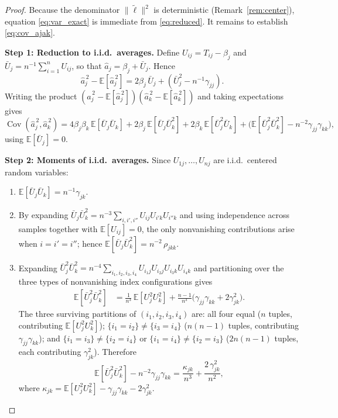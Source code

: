 \documentclass[11pt]{article}
\newcommand{\Cov}{\operatorname{Cov}}
\newcommand{\E}{\mathbb{E}}
\theoremstyle{plain}
\theoremstyle{definition}
\theoremstyle{remark}
\begin{document}
\begin{proof}
Because the denominator $\|\widetilde{\boldsymbol{\ell}}\|^2$ is
deterministic (Remark~\ref{rem:center}), equation \eqref{eq:var_exact}
is immediate from \eqref{eq:reduced}.
It remains to establish \eqref{eq:cov_ajak}.

\smallskip
\noindent\textbf{Step 1: Reduction to i.i.d.\ averages.}
Define $U_{ij} = T_{ij} - \beta_j$ and
$\bar U_j = n^{-1}\sum_{i=1}^n U_{ij}$, so that
$\widehat{a}_j = \beta_j + \bar U_j$.  Hence
\[
    \widehat{a}_j^{\,2} - \E[\widehat{a}_j^{\,2}]
    = 2\beta_j\,\bar U_j + (\bar U_j^2 - n^{-1}\gamma_{jj}).
\]
Writing the product
$(\widehat{a}_j^{\,2}-\E[\widehat{a}_j^{\,2}])
(\widehat{a}_k^{\,2}-\E[\widehat{a}_k^{\,2}])$
and taking expectations gives
\begin{equation}\label{eq:cov_decomp}
    \Cov(\widehat{a}_j^{\,2},\widehat{a}_k^{\,2})
    = 4\beta_j\beta_k\,\E[\bar U_j\bar U_k]
      + 2\beta_j\,\E[\bar U_j\bar U_k^2]
      + 2\beta_k\,\E[\bar U_j^2\bar U_k]
      + \bigl(\E[\bar U_j^2\bar U_k^2] - n^{-2}\gamma_{jj}\gamma_{kk}\bigr),
\end{equation}
using $\E[\bar U_j]=0$.

\smallskip
\noindent\textbf{Step 2: Moments of i.i.d.\ averages.}
Since $U_{1j},\dots,U_{nj}$ are i.i.d.\ centered random variables:

\begin{enumerate}
\item[(a)] $\E[\bar U_j\bar U_k] = n^{-1}\gamma_{jk}$.

\item[(b)] By expanding $\bar U_j\bar U_k^2 =
n^{-3}\sum_{i,i',i''}U_{ij}U_{i'k}U_{i''k}$ and using independence
across samples together with $\E[U_{ij}]=0$, the only nonvanishing
contributions arise when $i=i'=i''$; hence
$\E[\bar U_j\bar U_k^2] = n^{-2}\,\rho_{jkk}$.

\item[(c)] Expanding
$\bar U_j^2\bar U_k^2
= n^{-4}\sum_{i_1,i_2,i_3,i_4}U_{i_1 j}U_{i_2 j}U_{i_3 k}U_{i_4 k}$
and partitioning over the three types of
nonvanishing index configurations gives
\begin{align*}
    \E[\bar U_j^2\bar U_k^2]
    &= \frac{1}{n^3}\,\E[U_j^2 U_k^2]
     + \frac{n-1}{n^3}
       \bigl(\gamma_{jj}\gamma_{kk}+2\gamma_{jk}^2\bigr).
\end{align*}
The three surviving partitions of $(i_1,i_2,i_3,i_4)$ are:
all four equal ($n$ tuples, contributing $\E[U_j^2U_k^2]$);
$\{i_1=i_2\}\neq\{i_3=i_4\}$ ($n(n{-}1)$ tuples, contributing
$\gamma_{jj}\gamma_{kk}$);
and $\{i_1=i_3\}\neq\{i_2=i_4\}$ or
$\{i_1=i_4\}\neq\{i_2=i_3\}$ ($2n(n{-}1)$ tuples, each contributing
$\gamma_{jk}^2$).
Therefore
\[
    \E[\bar U_j^2\bar U_k^2] - n^{-2}\gamma_{jj}\gamma_{kk}
    = \frac{\kappa_{jk}}{n^3}
      + \frac{2\,\gamma_{jk}^2}{n^2},
\]
where $\kappa_{jk}=\E[U_j^2U_k^2]-\gamma_{jj}\gamma_{kk}-2\gamma_{jk}^2$.
\end{enumerate}


\end{proof}
\end{document}
